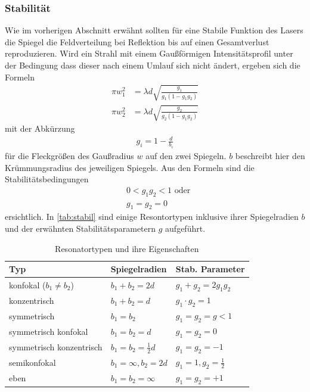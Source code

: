 \subsubsection{Stabilität}\label{subsubsec:stabilitaet}
Wie im vorherigen Abschnitt erwähnt sollten für eine Stabile Funktion des Lasers die Spiegel die Feldverteilung bei Reflektion bis auf einen Gesamtverlust reproduzieren. Wird ein Strahl mit einem Gaußförmigen Intensitätsprofil unter der Bedingung dass dieser nach einem Umlauf sich nicht ändert, ergeben sich die Formeln
\begin{align*}
    \pi w_1^2 &=\lambda d \sqrt{\frac{g_1}{g_1(1-g_1g_2)}}\\
    \pi w_2^2 &=\lambda d \sqrt{\frac{g_2}{g_2(1-g_1g_2)}}
\end{align*} 
mit der Abkürzung 
\begin{align}
    g_i=1-\frac{d}{b_i}
\end{align} 
für die Fleckgrößen des Gaußradius $w$ auf den zwei Spiegeln. $b$ beschreibt hier den Krümmungsradius des jeweiligen Spiegels.
Aus den Formeln sind die Stabilitätsbedingungen
\begin{align}
    &0<g_1g_2<1\text{ oder}\\
    &g_1=g_2=0
\end{align}
ersichtlich. In \autoref{tab:stabil} sind einige Resontortypen inklusive ihrer Spiegelradien $b$ und der erwähnten Stabilitätsparametern $g$ aufgeführt.
\begin{table}[H]
  \centering
  \caption{Resonatortypen und ihre Eigenschaften}
  \begin{tabular}{l | l | l}
    \toprule
    Typ & Spiegelradien & Stab. Parameter \\
    \midrule
    konfokal ($b_1 \neq b_2$)            & $b_1 + b_2 = 2d$             & $g_1 + g_2 = 2g_1g_2$ \\
    konzentrisch                         & $b_1 + b_2 = d$              & $g_1 \cdot g_2 = 1$ \\
    symmetrisch                          & $b_1 = b_2$                  & $g_1 = g_2 = g < 1$ \\
    symmetrisch konfokal                 & $b_1 = b_2 = d$              & $g_1 = g_2 = 0$ \\
    symmetrisch konzentrisch             & $b_1 = b_2 = \frac{1}{2}d$   & $g_1 = g_2 = -1$ \\
    semikonfokal                         & $b_1 = \infty, b_2 = 2d$     & $g_1 = 1, g_2 = \frac{1}{2}$ \\
    eben                                 & $b_1 = b_2 = \infty$         & $g_1 = g_2 = +1$ \\
    \bottomrule
  \end{tabular}
  \label{tab:stabil}
\end{table}
